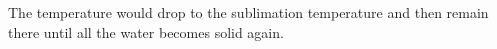 The temperature would drop to the sublimation temperature and then remain there until all the water becomes solid again.